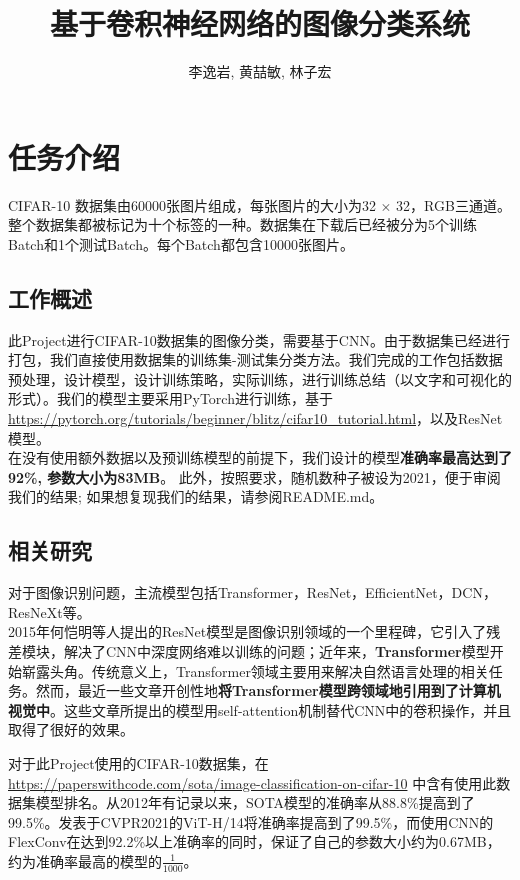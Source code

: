 \documentclass{article}
\theoremstyle{definition}
\begin{document}
\title{基于卷积神经网络的图像分类系统}
\author{李逸岩, 黄喆敏, 林子宏}
\maketitle

\section{任务介绍}
CIFAR-10 数据集由60000张图片组成，每张图片的大小为32 $\times$ 32，RGB三通道。整个数据集都被标记为十个标签的一种。数据集在下载后已经被分为5个训练Batch和1个测试Batch。每个Batch都包含10000张图片。\cite{2009learning}

\subsection{工作概述}
此Project进行CIFAR-10数据集的图像分类，需要基于CNN。由于数据集已经进行打包，我们直接使用数据集的训练集-测试集分类方法。我们完成的工作包括数据预处理，设计模型，设计训练策略，实际训练，进行训练总结（以文字和可视化的形式）。我们的模型主要采用PyTorch进行训练，基于\url{https://pytorch.org/tutorials/beginner/blitz/cifar10_tutorial.html}，以及ResNet模型。 \\
\indent
在没有使用额外数据以及预训练模型的前提下，我们设计的模型\textbf{准确率最高达到了92\%, 参数大小为83MB}。 此外，按照要求，随机数种子被设为2021，便于审阅我们的结果; 如果想复现我们的结果，请参阅README.md。

\subsection {相关研究}
对于图像识别问题，主流模型包括Transformer\cite{dosovitskiy2021image}，ResNet\cite{kolesnikov2020big}，EfficientNet\cite{tan2021efficientnetv2}，DCN\cite{sousa2021cnn}，ResNeXt\cite{Li_2019_CVPR}等。\\

\indent 2015年何恺明等人提出的ResNet模型\cite{resnet2016}是图像识别领域的一个里程碑，它引入了残差模块，解决了CNN中深度网络难以训练的问题；近年来，\textbf{Transformer}模型开始崭露头角。传统意义上，Transformer领域主要用来解决自然语言处理的相关任务。然而，最近一些文章开创性地\textbf{将Transformer模型跨领域地引用到了计算机视觉中}。这些文章所提出的模型用self-attention机制替代CNN中的卷积操作，并且取得了很好的效果。\cite{dosovitskiy2021image}

\indent 对于此Project使用的CIFAR-10数据集，在\\
\url{https://paperswithcode.com/sota/image-classification-on-cifar-10} 中含有使用此数据集模型排名。从2012年有记录以来，SOTA模型的准确率从88.8\%提高到了99.5\%。发表于CVPR2021的ViT-H/14将准确率提高到了99.5\%\cite{dosovitskiy2021image}，而使用CNN的FlexConv在达到92.2\%以上准确率的同时\cite{romero2021flexconv}，保证了自己的参数大小约为0.67MB，约为准确率最高的模型的$\frac{1}{1000}$。
\end{document}
